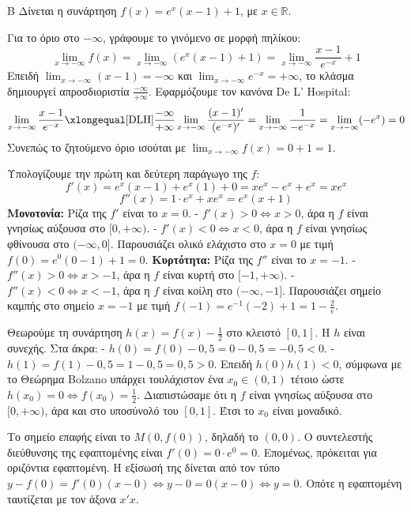 \begin{thema}{Β}
Δίνεται η συνάρτηση $f(x) = e^x(x-1) + 1$, με $x \in \mathbb{R}$.
\begin{erwthma}
\item Για το όριο στο $-\infty$, γράφουμε το γινόμενο σε μορφή πηλίκου:
\[ \lim_{x\to-\infty} f(x) = \lim_{x\to-\infty} (e^x(x-1) + 1) = \lim_{x\to-\infty} \frac{x-1}{e^{-x}} + 1 \]
Επειδή $\lim_{x\to-\infty} (x-1) = -\infty$ και $\lim_{x\to-\infty} e^{-x} = +\infty$, το κλάσμα δημιουργεί απροσδιοριστία $\frac{-\infty}{+\infty}$. Εφαρμόζουμε τον κανόνα De L' Hospital:
\[ \lim_{x\to-\infty} \frac{x-1}{e^{-x}} \xlongequal[\text{DLH}]{\frac{-\infty}{+\infty}} \lim_{x\to-\infty} \frac{(x-1)'}{(e^{-x})'} = \lim_{x\to-\infty} \frac{1}{-e^{-x}} = \lim_{x\to-\infty} (-e^x) = 0 \]
Συνεπώς το ζητούμενο όριο ισούται με $\lim_{x\to-\infty} f(x) = 0 + 1 = 1$.

\item Υπολογίζουμε την πρώτη και δεύτερη παράγωγο της $f$:
\[ f'(x) = e^x(x-1) + e^x(1) + 0 = x e^x - e^x + e^x = x e^x \]
\[ f''(x) = 1 \cdot e^x + x e^x = e^x(x+1) \]
\textbf{Μονοτονία:}
Ρίζα της $f'$ είναι το $x=0$.
- $f'(x) > 0 \Leftrightarrow x > 0$, άρα η $f$ είναι γνησίως αύξουσα στο $[0, +\infty)$.
- $f'(x) < 0 \Leftrightarrow x < 0$, άρα η $f$ είναι γνησίως φθίνουσα στο $(-\infty, 0]$.
Παρουσιάζει ολικό ελάχιστο στο $x=0$ με τιμή $f(0) = e^0(0-1)+1 = 0$.
\textbf{Κυρτότητα:}
Ρίζα της $f''$ είναι το $x=-1$.
- $f''(x) > 0 \Leftrightarrow x > -1$, άρα η $f$ είναι κυρτή στο $[-1, +\infty)$.
- $f''(x) < 0 \Leftrightarrow x < -1$, άρα η $f$ είναι κοίλη στο $(-\infty, -1]$.
Παρουσιάζει σημείο καμπής στο σημείο $x=-1$ με τιμή $f(-1) = e^{-1}(-2) + 1 = 1 - \frac{2}{e}$.

\item Θεωρούμε τη συνάρτηση $h(x) = f(x) - \frac{1}{2}$ στο κλειστό $[0, 1]$.
Η $h$ είναι συνεχής. Στα άκρα:
- $h(0) = f(0) - 0,5 = 0 - 0,5 = -0,5 < 0$.
- $h(1) = f(1) - 0,5 = 1 - 0,5 = 0,5 > 0$.
Επειδή $h(0)h(1) < 0$, σύμφωνα με το Θεώρημα Bolzano υπάρχει τουλάχιστον ένα $x_0 \in (0, 1)$ τέτοιο ώστε $h(x_0)=0 \Leftrightarrow f(x_0) = \frac{1}{2}$.
Διαπιστώσαμε ότι η $f$ είναι γνησίως αύξουσα στο $[0, +\infty)$, άρα και στο υποσύνολό του $[0, 1]$. Έτσι το $x_0$ είναι μοναδικό.

\item Το σημείο επαφής είναι το $M(0, f(0))$, δηλαδή το $(0, 0)$.
Ο συντελεστής διεύθυνσης της εφαπτομένης είναι $f'(0) = 0 \cdot e^0 = 0$. Επομένως, πρόκειται για οριζόντια εφαπτομένη.
Η εξίσωσή της δίνεται από τον τύπο $y - f(0) = f'(0)(x-0) \Leftrightarrow y - 0 = 0(x-0) \Leftrightarrow y = 0$. 
Οπότε η εφαπτομένη ταυτίζεται με τον άξονα $x'x$.
\end{erwthma}
\end{thema}


